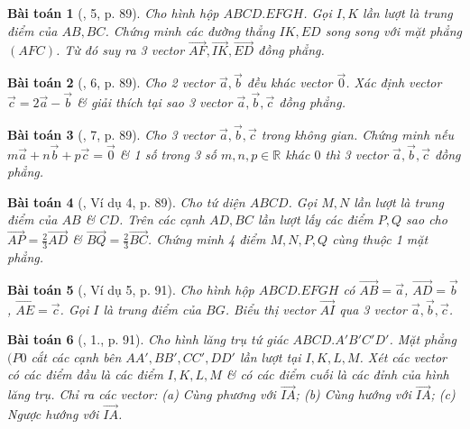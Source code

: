 \documentclass{article}
\numberwithin{equation}{section}
\newtheorem{baitoan}{Bài toán}
\begin{document}
\begin{baitoan}[\cite{SGK_Toan_11_hinh_hoc_co_ban}, 5, p. 89]
	Cho hình hộp $ABCD.EFGH$. Gọi $I,K$ lần lượt là trung điểm của $AB,BC$. Chứng minh các đường thẳng $IK,ED$ song song với mặt phẳng $(AFC)$. Từ đó suy ra 3 vector $\overrightarrow{AF},\overrightarrow{IK},\overrightarrow{ED}$ đồng phẳng.
\end{baitoan}

\begin{baitoan}[\cite{SGK_Toan_11_hinh_hoc_co_ban}, 6, p. 89]
	Cho 2 vector $\vec{a},\vec{b}$ đều khác vector $\vec{0}$. Xác định vector $\vec{c} = 2\vec{a} - \vec{b}$ \& giải thích tại sao 3 vector $\vec{a},\vec{b},\vec{c}$ đồng phẳng.
\end{baitoan}

\begin{baitoan}[\cite{SGK_Toan_11_hinh_hoc_co_ban}, 7, p. 89]
	Cho 3 vector $\vec{a},\vec{b},\vec{c}$ trong không gian. Chứng minh nếu $m\vec{a} + n\vec{b} + p\vec{c} = \vec{0}$ \& 1 số trong 3 số $m,n,p\in\mathbb{R}$ khác $0$ thì 3 vector $\vec{a},\vec{b},\vec{c}$ đồng phẳng.
\end{baitoan}

\begin{baitoan}[\cite{SGK_Toan_11_hinh_hoc_co_ban}, Ví dụ 4, p. 89]
	Cho tứ diện $ABCD$. Gọi $M,N$ lần lượt là trung điểm của $AB$ \& $CD$. Trên các cạnh $AD,BC$ lần lượt lấy các điểm $P,Q$ sao cho $\overrightarrow{AP} = \frac{2}{3}\overrightarrow{AD}$ \& $\overrightarrow{BQ} = \frac{2}{3}\overrightarrow{BC}$. Chứng minh 4 điểm $M,N,P,Q$ cùng thuộc 1 mặt phẳng.
\end{baitoan}

\begin{baitoan}[\cite{SGK_Toan_11_hinh_hoc_co_ban}, Ví dụ 5, p. 91]
	Cho hình hộp $ABCD.EFGH$ có $\overrightarrow{AB} = \vec{a}$, $\overrightarrow{AD} = \vec{b}$, $\overrightarrow{AE} = \vec{c}$. Gọi $I$ là trung điểm của $BG$. Biểu thị vector $\overrightarrow{AI}$ qua 3 vector $\vec{a},\vec{b},\vec{c}$.
\end{baitoan}

\begin{baitoan}[\cite{SGK_Toan_11_hinh_hoc_co_ban}, 1., p. 91]
	Cho hình lăng trụ tứ giác $ABCD.A'B'C'D'$. Mặt phẳng $(P0$ cắt các cạnh bên $AA',BB',CC',DD'$ lần lượt tại $I,K,L,M$. Xét các vector có các điểm đầu là các điểm $I,K,L,M$ \& có các điểm cuối là các đỉnh của hình lăng trụ. Chỉ ra các vector: (a) Cùng phương với $\overrightarrow{IA}$; (b) Cùng hướng với $\overrightarrow{IA}$; (c) Ngược hướng với $\overrightarrow{IA}$.
\end{baitoan}
\end{document}
